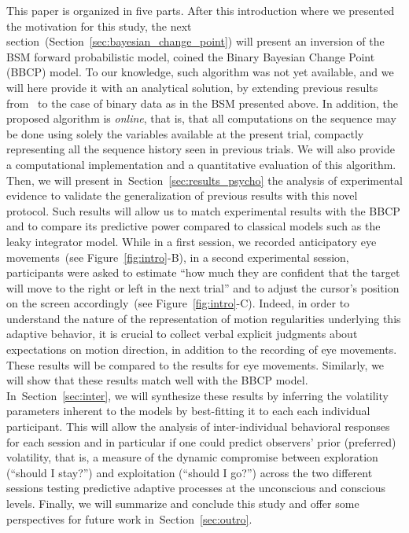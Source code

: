 \documentclass[12pt,english]{article}%
\newcommand{\citet}[1]{\textcite{#1}}
\newcommand{\seeFig}[1]{Figure~\ref{fig:#1}}
\newcommand{\seeSec}[1]{Section~\ref{sec:#1}}
\begin{document}
This paper is organized in five parts.
After this introduction where we presented the motivation for this study,
the next section~(\seeSec{bayesian_change_point}) will present
an inversion of the BSM forward probabilistic model,
coined the Binary Bayesian Change Point (BBCP) model.
To our knowledge, such algorithm was not yet available, and
we will here provide it with an analytical solution,
by extending previous results from~\citet{AdamsMackay2007}
to the case of binary data as in the BSM presented above.
In addition, the proposed algorithm is \emph{online},
that is, that all computations on the sequence may be done
using solely the variables available at the present trial,
compactly representing all the sequence history seen in previous trials.
We will also provide a computational implementation
and a quantitative evaluation of this algorithm.
Then, we will present in~\seeSec{results_psycho} the analysis of experimental evidence
to validate the generalization of previous results %
with this novel protocol. %
Such results will allow us to match experimental results with the BBCP
and to compare its predictive power compared to classical models such as the leaky integrator model.
While in a first session, we recorded anticipatory eye movements~(see \seeFig{intro}-B), 
in a second experimental session, participants were asked to estimate
``how much they are confident that
the target will move to the right or left in the next trial'' and
to adjust the cursor's position on the screen accordingly~(see \seeFig{intro}-C).
Indeed, in order to understand the nature of the representation of motion regularities underlying this adaptive behavior, 
it is crucial to collect verbal explicit judgments 
about expectations on motion direction, 
in addition to the recording of eye movements.
These results will be compared to the results for eye movements.
Similarly, we will show that these results match well
with the BBCP model.
In~\seeSec{inter}, we will synthesize these results
by inferring the volatility parameters inherent to the models
by best-fitting it to each each individual participant. 
This will allow the analysis of inter-individual behavioral responses for each session
and in particular if one could predict observers' prior (preferred) volatility,
that is, a measure of the dynamic compromise between exploration (``should I stay?'')
and exploitation (``should I go?'')
across the two different sessions testing predictive adaptive processes
at the unconscious and conscious levels.
Finally, we will summarize and conclude this study and
offer some perspectives for future work in~\seeSec{outro}.
%
\end{document}
